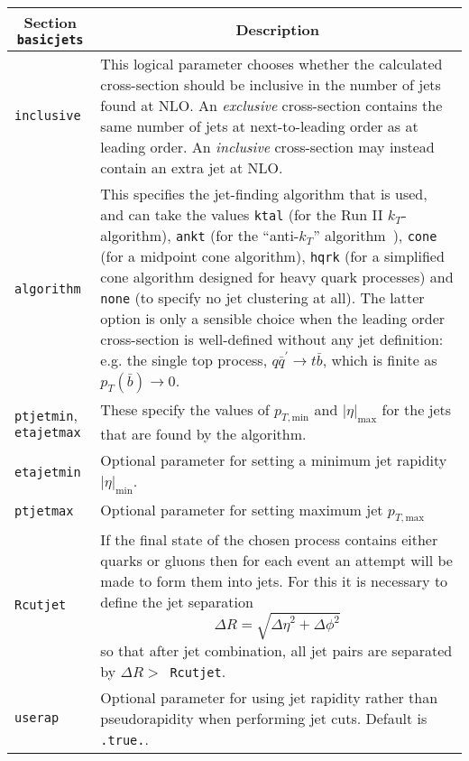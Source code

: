 	\begin{longtable}{p{1.5cm}p{12cm}}
		\hline
		\multicolumn{1}{c}{{\textbf{Section} \texttt{basicjets}}} & \multicolumn{1}{c}{{\textbf{Description}}} \\ 
		\hline
		\texttt{inclusive} &
		This logical parameter chooses whether the
		calculated cross-section should be inclusive in the number of jets
		found at NLO. An {\em exclusive}
		cross-section contains the same number of jets at next-to-leading
		order as at leading order. An {\em inclusive} cross-section may
		instead contain an extra jet at NLO. \\
		\texttt{algorithm} &
		This specifies the jet-finding algorithm that
		is used, and can take the values
		{\tt ktal} (for the Run II $k_T$-algorithm), {\tt ankt} (for the
		``anti-$k_T$'' algorithm~\cite{Cacciari:2008gp}), {\tt cone} (for
		a midpoint cone algorithm), {\tt hqrk} (for a simplified cone
		algorithm designed for heavy quark processes) and {\tt none} (to
		specify no jet clustering at all). The latter option is only a
		sensible choice when the leading order cross-section is well-defined
		without any jet definition: e.g. the single top process,
		$q{\bar q^\prime} \to t{\bar b}$, which is finite as
		$p_T({\bar b}) \to 0$. \\
		\texttt{ptjetmin}, \texttt{etajetmax} &
		These specify the values
		of $p_{T,{\mathrm{min}}}$ and $|\eta|_{\mathrm{max}}$ for the
		jets that are found by the algorithm.  \\
		\texttt{etajetmin} &
		Optional parameter for setting a minimum jet rapidity $|\eta|_{\mathrm{min}}$. \\
		\texttt{ptjetmax} &
		Optional parameter for setting maximum jet $p_{T,{\mathrm{max}}}$\\
		\texttt{Rcutjet} &
		If the final state of the chosen process contains
		either quarks or gluons then for each event an attempt will be made
		to form them into jets. For this it is necessary to define the
		jet separation
                \begin{equation} \label{DeltaRdef}
                  \Delta R=\sqrt{{\Delta \eta}^2 + {\Delta \phi}^2}
		\end{equation}
                so that after jet combination, all jet pairs are separated by
		$\Delta R >$~{\tt Rcutjet}.\\
		\texttt{userap} &
		Optional parameter for using jet rapidity rather than pseudorapidity when
		performing jet cuts. Default is {\tt .true.}. \\
		\hline
	\end{longtable}
